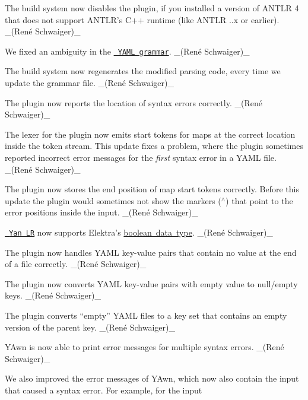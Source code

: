 \begin{DoxyItemize}
\item The build system now disables the plugin, if you installed a version of A\+N\+T\+LR 4 that does not support A\+N\+T\+L\+R’s C++ runtime (like A\+N\+T\+LR {..\+x} or earlier). \+\_\+(René Schwaiger)\+\_\+
\item We fixed an ambiguity in the \href{https://master.libelektra.org/src/plugins/yanlr/YAML.g4}{\texttt{ Y\+A\+ML grammar}}. \+\_\+(René Schwaiger)\+\_\+
\item The build system now regenerates the modified parsing code, every time we update the grammar file. \+\_\+(René Schwaiger)\+\_\+
\item The plugin now reports the location of syntax errors correctly. \+\_\+(René Schwaiger)\+\_\+
\item The lexer for the plugin now emits start tokens for maps at the correct location inside the token stream. This update fixes a problem, where the plugin sometimes reported incorrect error messages for the {\itshape first} syntax error in a Y\+A\+ML file. \+\_\+(René Schwaiger)\+\_\+
\item The plugin now stores the end position of map start tokens correctly. Before this update the plugin would sometimes not show the markers ({\ttfamily $^\wedge$}) that point to the error positions inside the input. \+\_\+(René Schwaiger)\+\_\+
\item \href{https://www.libelektra.org/plugins/yanlr}{\texttt{ Yan LR}} now supports Elektra’s \mbox{\hyperlink{doc_decisions_boolean_md}{boolean data type}}. \+\_\+(René Schwaiger)\+\_\+
\item The plugin now handles Y\+A\+ML key-\/value pairs that contain no value at the end of a file correctly. \+\_\+(René Schwaiger)\+\_\+
\item The plugin now converts Y\+A\+ML key-\/value pairs with empty value to null/empty keys. \+\_\+(René Schwaiger)\+\_\+
\item The plugin converts “empty” Y\+A\+ML files to a key set that contains an empty version of the parent key. \+\_\+(René Schwaiger)\+\_\+
\end{DoxyItemize}


\begin{DoxyItemize}
\item Y\+Awn is now able to print error messages for multiple syntax errors. \+\_\+(René Schwaiger)\+\_\+
\item We also improved the error messages of Y\+Awn, which now also contain the input that caused a syntax error. For example, for the input
\end{DoxyItemize}


